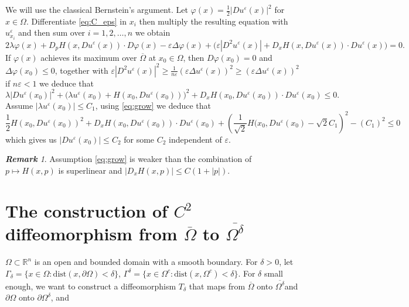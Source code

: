 \documentclass[11pt,reqno]{amsart}
\numberwithin{figure}{section}
\theoremstyle{plain}
\theoremstyle{remark}
\newtheorem{rem}{\bf{Remark}}
\numberwithin{equation}{section}
\begin{document}
\noindent We will use the classical Bernstein's argument. Let $\varphi(x) = \frac{1}{2}|Du^\varepsilon(x)|^2$ for $x\in \Omega$. Differentiate \eqref{eq:C_eps} in $x_i$ then multiply the resulting equation with $u^\varepsilon_{x_i}$ and then sum over $i=1,2,\ldots, n$ we obtain 
\begin{equation*}
    2\lambda \varphi(x) + D_pH(x,Du^\varepsilon(x))\cdot D\varphi(x) - \varepsilon \Delta \varphi(x) + \Big(\varepsilon |D^2u^\varepsilon(x)| + D_xH(x,Du^\varepsilon(x))\cdot Du^\varepsilon(x)\Big) = 0.
\end{equation*}
If $\varphi(x)$ achieves its maximum over $\overline{\Omega}$ at $x_0\in \Omega$, then $D\varphi(x_0) = 0$ and $\Delta \varphi(x_0)\leq 0$, together with $\varepsilon |D^2u^\varepsilon(x)|^2\geq \frac{1}{n\varepsilon}(\varepsilon\Delta u^\varepsilon(x))^2\geq (\varepsilon\Delta u^\varepsilon(x))^2$ if $n\varepsilon < 1$ we deduce that
\begin{equation*}
    \lambda |D u^\varepsilon(x_0)|^2 + \Big(\lambda u^\varepsilon(x_0)+H(x_0,Du^\varepsilon(x_0))\Big)^2 + D_xH(x_0,Du^\varepsilon(x_0))\cdot Du^\varepsilon(x_0) \leq 0.
\end{equation*}
Assume $|\lambda u^\varepsilon(x_0)|\leq C_1$, using \eqref{eq:grow} we deduce that
\begin{equation*}
    \frac{1}{2}H(x_0,Du^\varepsilon(x_0))^2 + D_xH(x_0,Du^\varepsilon(x_0))\cdot Du^\varepsilon(x_0) + \left(\frac{1}{\sqrt{2}}H(x_0,Du^\varepsilon(x_0) - \sqrt{2}C_1\right)^2 - \left(C_1\right)^2\leq 0
\end{equation*}
which gives us $|Du^\varepsilon(x_0)|\leq C_2$ for some $C_2$ independent of $\varepsilon$. 
\begin{rem} Assumption \eqref{eq:grow} is weaker than the combination of $p\mapsto H(x,p)$ is superlinear and $|D_xH(x,p)|\leq C(1+|p|)$.
\end{rem}


\section{The construction of $C^2$ diffeomorphism from $\overline{\Omega}$ to $\overline{\Omega^\delta}$}
$\Omega \subset \mathbb{R}^n$ is an open and bounded domain with a smooth boundary. For $\delta > 0$, let $\Gamma_\delta = \{x \in \Omega: \mathrm{dist}(x, \partial \Omega) < \delta \}$, $\Gamma^\delta = \{x \in \Omega^c: \mathrm{dist}(x, \Omega^c) < \delta \}$. For $\delta$ small enough, we want to construct a diffeomorphism $T_\delta$ that maps from $\overline{\Omega}$ onto $\overline{\Omega^\delta}$and $\partial \Omega$ onto $\partial \Omega^\delta$, and
\end{document}
